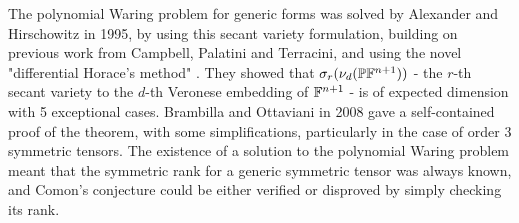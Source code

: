 \documentclass[../Lael_John_MasterThesis_Draft.tex]{subfiles}
\begin{document}
The polynomial Waring problem for generic forms was solved by Alexander and Hirschowitz in 1995, by using this secant variety formulation, building on previous work from Campbell, Palatini and Terracini, and using the novel "differential Horace's method" \cite{bernardi_hitchhiker_2018}. They showed that $\sigma_r(\nu_d(\mathbb{P} \mathbb{F}^{n+1}))$ - the $r$-th secant variety to the $d$-th Veronese embedding of $\mathbb{F}^{n+1}$ - is of expected dimension with 5 exceptional cases. Brambilla and Ottaviani \cite{brambilla_alexanderhirschowitz_2008} in 2008 gave a self-contained proof of the theorem, with some simplifications, particularly in the case of order $3$ symmetric tensors. The existence of a solution to the polynomial Waring problem meant that the symmetric rank for a generic symmetric tensor was always known, and Comon's conjecture could be either verified or disproved by simply checking its rank.

\end{document}
